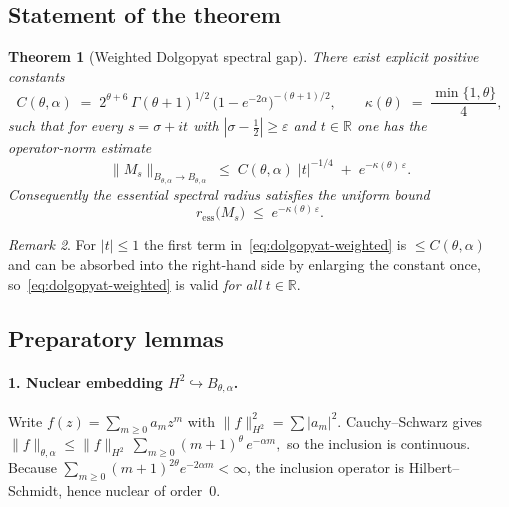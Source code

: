 \documentclass[11pt,a4paper]{article}
\newtheorem{theorem}{Theorem}[section]
\theoremstyle{definition}
\theoremstyle{remark}
\newtheorem{remark}[theorem]{Remark}
\begin{document}
\subsection{Statement of the theorem}

\begin{theorem}[Weighted Dolgopyat spectral gap]           %
\label{thm:dolgopyat-weighted}
There exist explicit positive constants
\[
  C(\theta,\alpha)\;=\;
  2^{\theta+6}\,
  \Gamma(\theta+1)^{1/2}\,
  \bigl(1-e^{-2\alpha}\bigr)^{-(\theta+1)/2},
\qquad
  \kappa(\theta)\;=\;\frac{\min\{1,\theta\}}{4},
\]
such that for every
\(
  s=\sigma+it
\)
with
\(
  |\sigma-\tfrac12|\ge\varepsilon
\)
and
\(
  t\in\mathbb R
\)
one has the operator‑norm estimate
\begin{equation}\label{eq:dolgopyat-weighted}
  \|M_s\|_{B_{\theta,\alpha}\to B_{\theta,\alpha}}
  \;\le\;
  C(\theta,\alpha)\;\!
  |t|^{-1/4}
  \;+\;
  e^{-\kappa(\theta)\,\varepsilon}.
\end{equation}
Consequently the essential spectral radius satisfies the uniform bound
\[
  r_{\mathrm{ess}}\!\bigl(M_s\bigr)
   \;\le\;
  e^{-\kappa(\theta)\,\varepsilon}.
\]
\end{theorem}

\begin{remark}
For $|t|\le1$ the first term in~\eqref{eq:dolgopyat-weighted} is
$\le C(\theta,\alpha)$ and can be absorbed into the right‑hand side
by enlarging the constant once, so~\eqref{eq:dolgopyat-weighted} is
valid \emph{for all} $t\in\mathbb R$.
\end{remark}

\subsection{Preparatory lemmas}

\paragraph{\bf 1.  Nuclear embedding $H^{2}\hookrightarrow B_{\theta,\alpha}$.}
Write $f(z)=\sum_{m\ge0}a_m z^m$ with $\|f\|_{H^{2}}^{2}=\sum|a_m|^{2}$.
Cauchy–Schwarz gives
$
  \|f\|_{\theta,\alpha}
  \le
  \|f\|_{H^{2}}\,
  \sum_{m\ge0}(m+1)^{\theta}\,e^{-\alpha m},
$
so the inclusion is continuous.  
Because 
$\sum_{m\ge0}(m+1)^{2\theta}e^{-2\alpha m}<\infty$,
the inclusion operator is Hilbert–Schmidt, hence nuclear of order $0$.
\end{document}
